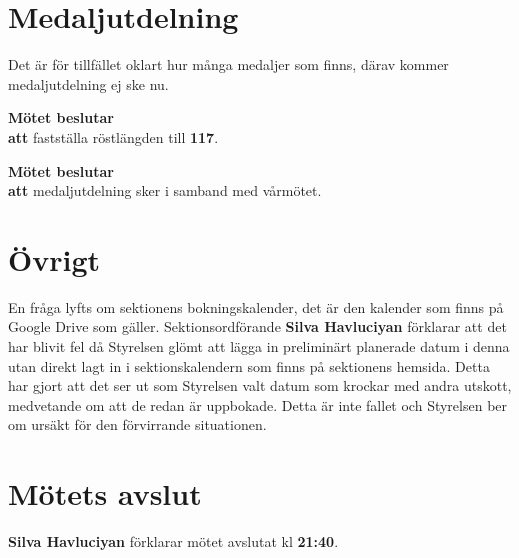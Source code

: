 \documentclass{datateknologsektionen-document}
\newcommand{\ind}{\hspace*{2em}}
\newcommand{\motetbeslutar}{\textbf{Mötet beslutar}}
\newcommand{\att}{\\\ind\textbf{att}}
\newcommand{\rostlangd}[1]{\motetbeslutar\att{} fastställa röstlängden till \textbf{#1}.}
\begin{document}
\pagebreak

\section{Medaljutdelning}

Det är för tillfället oklart hur många medaljer som finns, därav kommer medaljutdelning ej ske nu.

\rostlangd{117}

\motetbeslutar\att{} medaljutdelning sker i samband med vårmötet.

\section{Övrigt}

En fråga lyfts om sektionens bokningskalender, det är den kalender som finns på Google Drive som gäller. Sektionsordförande \textbf{Silva Havluciyan} 
förklarar att det har blivit fel då Styrelsen glömt att lägga in preliminärt planerade datum i denna utan direkt lagt in i sektionskalendern som finns på sektionens hemsida. 
Detta har gjort att det ser ut som Styrelsen valt datum som krockar med andra utskott, medvetande om att de redan är uppbokade. Detta är inte 
fallet och Styrelsen ber om ursäkt för den förvirrande situationen.  

\section{Mötets avslut}


\textbf{Silva Havluciyan} förklarar mötet avslutat kl \textbf{21:40}.


\end{document}
